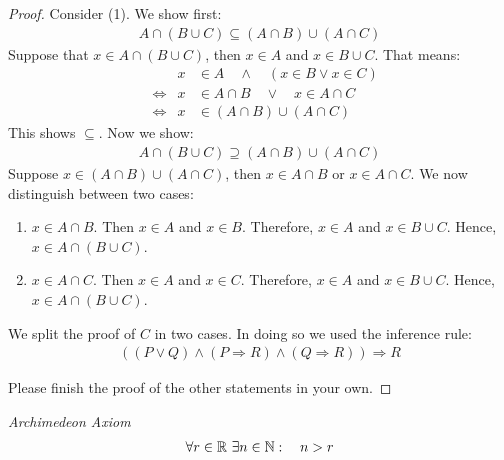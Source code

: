 \begin{proof}
Consider (1). We show first:
\begin{align*}
A \cap ( B \cup C) \subseteq (A \cap B) \cup (A \cap C)
\end{align*}
Suppose that $x \in A \cap (B \cup C)$, then $x \in A$ and $x \in B\cup C$.
That means:
\begin{align*}
& & x & \in A  \quad \wedge \quad ( x \in B \vee x \in C) \\
& \Leftrightarrow & x & \in A \cap B \quad \vee \quad x \in A \cap C \\
& \Leftrightarrow & x  & \in (A \cap B) \cup (A \cap C)
\end{align*} 
This shows $\subseteq$.
Now we show:
\begin{align*}
A \cap (B \cup C) \supseteq (A\cap B) \cup (A \cap C)
\end{align*}
Suppose $x \in (A\cap B) \cup (A \cap C)$, then $x \in A \cap B$ or $x \in A \cap C$. We now distinguish between two cases:
\begin{enumerate}
\item
$x \in A \cap B$. Then $x \in A$ and $x \in B$. Therefore, $x \in A$ and $x \in B \cup C$. Hence, $x \in A \cap (B \cup C)$.
\item
$x \in A \cap C$. Then $x \in A$ and $x \in C$. Therefore, $ x \in A$ and $x \in B \cup C$. Hence, $ x \in A \cap (B \cup C)$.
\end{enumerate}

\begin{rk}
We split the proof of $C$ in two cases. In doing so we used the inference rule:
\begin{align*}
((P \vee Q) \wedge (P \Rightarrow R) \wedge (Q \Rightarrow R)) \Rightarrow R
\end{align*}
\end{rk} 
Please finish the proof of the other statements in your own.
\end{proof}


\begin{ax} \emph{Archimedeon Axiom}
\begin{align*}
\forall r \in \mathbb R~ \exists n \in \mathbb N : \quad n>r
\end{align*}
\end{ax}

